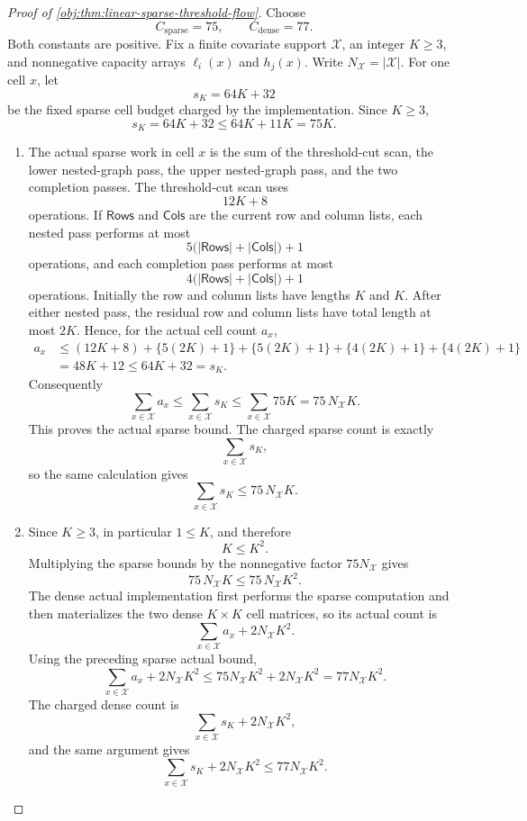\documentclass[11pt]{article}
\begin{document}
\begin{proof}[Proof of \cref{obj:thm:linear-sparse-threshold-flow}]
Choose
\[
C_{\mathrm{sparse}}=75,
\qquad
C_{\mathrm{dense}}=77 .
\]
Both constants are positive.  Fix a finite covariate support \(\mathcal X\), an integer \(K\ge 3\), and nonnegative capacity arrays \(\ell_i(x)\) and \(h_j(x)\).  Write \(N_{\mathcal X}=|\mathcal X|\).  For one cell \(x\), let
\[
s_K=64K+32
\]
be the fixed sparse cell budget charged by the implementation.  Since \(K\ge3\),
\[
s_K=64K+32\le 64K+11K=75K .
\]

\begin{enumerate}
\item The actual sparse work in cell \(x\) is the sum of the threshold-cut scan, the lower nested-graph pass, the upper nested-graph pass, and the two completion passes.  The threshold-cut scan uses
\[
12K+8
\]
operations.  If \(\mathsf{Rows}\) and \(\mathsf{Cols}\) are the current row and column lists, each nested pass performs at most
\[
5\bigl(|\mathsf{Rows}|+|\mathsf{Cols}|\bigr)+1
\]
operations, and each completion pass performs at most
\[
4\bigl(|\mathsf{Rows}|+|\mathsf{Cols}|\bigr)+1
\]
operations.  Initially the row and column lists have lengths \(K\) and \(K\).  After either nested pass, the residual row and column lists have total length at most \(2K\).  Hence, for the actual cell count \(a_x\),
\[
\begin{aligned}
a_x
&\le (12K+8)+\{5(2K)+1\}+\{5(2K)+1\}
      +\{4(2K)+1\}+\{4(2K)+1\}  \\
&=48K+12
\le 64K+32=s_K .
\end{aligned}
\]
Consequently
\[
\sum_{x\in\mathcal X} a_x
\le \sum_{x\in\mathcal X}s_K
\le \sum_{x\in\mathcal X}75K
=75\,N_{\mathcal X}K .
\]
This proves the actual sparse bound.  The charged sparse count is exactly
\[
\sum_{x\in\mathcal X}s_K,
\]
so the same calculation gives
\[
\sum_{x\in\mathcal X}s_K\le 75\,N_{\mathcal X}K .
\]

\item Since \(K\ge3\), in particular \(1\le K\), and therefore
\[
K\le K^2 .
\]
Multiplying the sparse bounds by the nonnegative factor \(75N_{\mathcal X}\) gives
\[
75\,N_{\mathcal X}K\le 75\,N_{\mathcal X}K^2 .
\]
The dense actual implementation first performs the sparse computation and then materializes the two dense \(K\times K\) cell matrices, so its actual count is
\[
\sum_{x\in\mathcal X}a_x+2N_{\mathcal X}K^2 .
\]
Using the preceding sparse actual bound,
\[
\sum_{x\in\mathcal X}a_x+2N_{\mathcal X}K^2
\le 75N_{\mathcal X}K^2+2N_{\mathcal X}K^2
=77N_{\mathcal X}K^2 .
\]
The charged dense count is
\[
\sum_{x\in\mathcal X}s_K+2N_{\mathcal X}K^2,
\]
and the same argument gives
\[
\sum_{x\in\mathcal X}s_K+2N_{\mathcal X}K^2
\le 77N_{\mathcal X}K^2 .
\]


\end{enumerate}
\end{proof}
\end{document}
